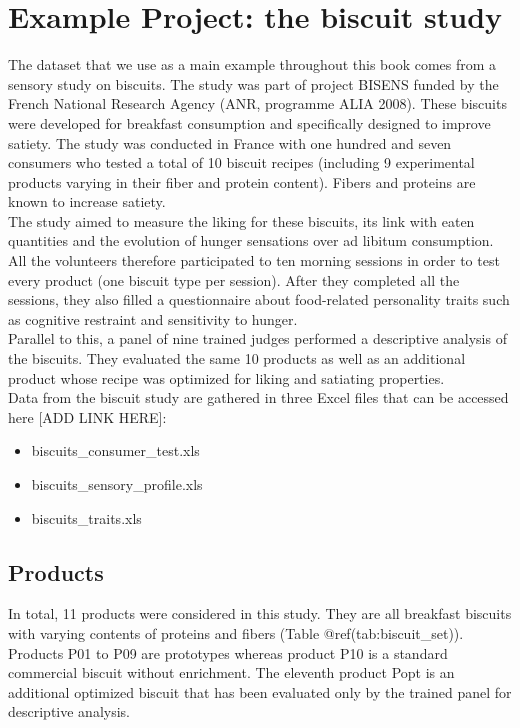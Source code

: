 \documentclass[
]{book}
\providecommand{\tightlist}{%
  \setlength{\itemsep}{0pt}\setlength{\parskip}{0pt}}
\begin{document}
\hypertarget{example-projects}{%
\chapter{Example Project: the biscuit study}\label{example-projects}}

The dataset that we use as a main example throughout this book comes from a sensory study on biscuits. The study was part of project BISENS funded by the French National Research Agency (ANR, programme ALIA 2008). These biscuits were developed for breakfast consumption and specifically designed to improve satiety.
The study was conducted in France with one hundred and seven consumers who tested a total of 10 biscuit recipes (including 9 experimental products varying in their fiber and protein content). Fibers and proteins are known to increase satiety.\\
The study aimed to measure the liking for these biscuits, its link with eaten quantities and the evolution of hunger sensations over ad libitum consumption. All the volunteers therefore participated to ten morning sessions in order to test every product (one biscuit type per session). After they completed all the sessions, they also filled a questionnaire about food-related personality traits such as cognitive restraint and sensitivity to hunger.\\
Parallel to this, a panel of nine trained judges performed a descriptive analysis of the biscuits. They evaluated the same 10 products as well as an additional product whose recipe was optimized for liking and satiating properties.\\
Data from the biscuit study are gathered in three Excel files that can be accessed here {[}ADD LINK HERE{]}:

\begin{itemize}
\tightlist
\item
  biscuits\_consumer\_test.xls\\
\item
  biscuits\_sensory\_profile.xls\\
\item
  biscuits\_traits.xls
\end{itemize}

\hypertarget{products}{%
\section{Products}\label{products}}

In total, 11 products were considered in this study. They are all breakfast biscuits with varying contents of proteins and fibers (Table @ref(tab:biscuit\_set)). Products P01 to P09 are prototypes whereas product P10 is a standard commercial biscuit without enrichment. The eleventh product Popt is an additional optimized biscuit that has been evaluated only by the trained panel for descriptive analysis.
\end{document}
